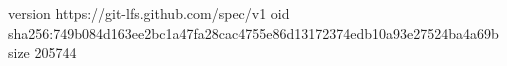 version https://git-lfs.github.com/spec/v1
oid sha256:749b084d163ee2bc1a47fa28cac4755e86d13172374edb10a93e27524ba4a69b
size 205744
